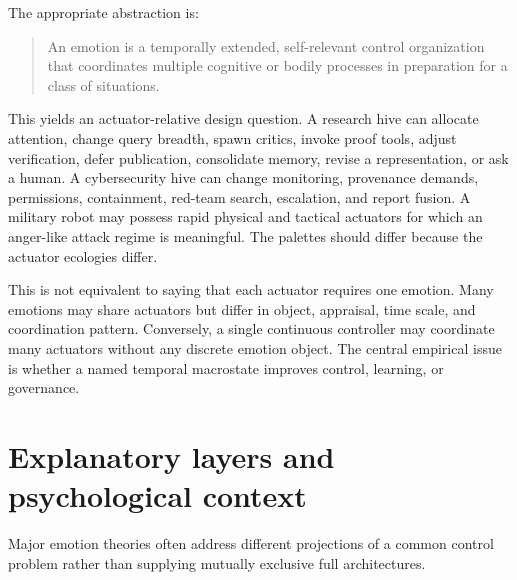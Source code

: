 \documentclass[11pt]{article}
\begin{document}
The appropriate abstraction is:
\begin{quote}
An emotion is a temporally extended, self-relevant control organization that
coordinates multiple cognitive or bodily processes in preparation for a class
of situations.
\end{quote}

This yields an actuator-relative design question.  A research hive can allocate
attention, change query breadth, spawn critics, invoke proof tools, adjust
verification, defer publication, consolidate memory, revise a representation,
or ask a human.  A cybersecurity hive can change monitoring, provenance demands,
permissions, containment, red-team search, escalation, and report fusion.  A
military robot may possess rapid physical and tactical actuators for which an
anger-like attack regime is meaningful.  The palettes should differ because the
actuator ecologies differ.

This is not equivalent to saying that each actuator requires one emotion.  Many
emotions may share actuators but differ in object, appraisal, time scale, and
coordination pattern.  Conversely, a single continuous controller may coordinate
many actuators without any discrete emotion object.  The central empirical issue
is whether a named temporal macrostate improves control, learning, or governance.

\section{Explanatory layers and psychological context}

Major emotion theories often address different projections of a common control
problem rather than supplying mutually exclusive full architectures.
\end{document}
